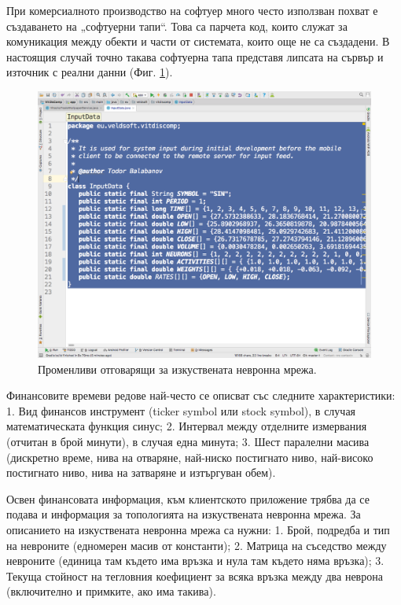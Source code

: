 \documentclass[book,14pt,oneside,openany]{memoir}
\begin{document}
При комерсиалното производство на софтуер много често използван похват е създаването на „софтуерни тапи“. Това са парчета код, които служат за комуникация между обекти и части от системата, които още не са създадени. В настоящия случай точно такава софтуерна тапа представя липсата на сървър и източник с реални данни  (Фиг. \ref{fig:pic0035}).  

\begin{figure}[h]
  \centering
  \includegraphics[height=0.45\pdfpageheight]{./images/pic0035.png}
  \caption{Променливи отговарящи за изкуствената невронна мрежа.}
\label{fig:pic0035}
\end{figure}
\FloatBarrier

Финансовите времеви редове най-често се описват със следните характеристики: 1. Вид финансов инструмент (ticker symbol или stock symbol), в случая математическата функция синус; 2. Интервал между отделните измервания (отчитан в брой минути), в случая една минута; 3. Шест паралелни масива (дискретно време, нива на отваряне, най-ниско постигнато ниво, най-високо постигнато ниво, нива на затваряне и изтъргуван обем).

Освен финансовата информация, към клиентското приложение трябва да се подава и информация за топологията на изкуствената невронна мрежа. За описанието на изкуствената невронна мрежа са нужни: 1. Брой, подредба и тип на невроните (едномерен масив от константи); 2. Матрица на съседство между невроните (единица там където има връзка и нула там където няма връзка); 3. Текуща стойност на тегловния коефициент за всяка връзка между два неврона (включително и примките, ако има такива). 
\end{document}
